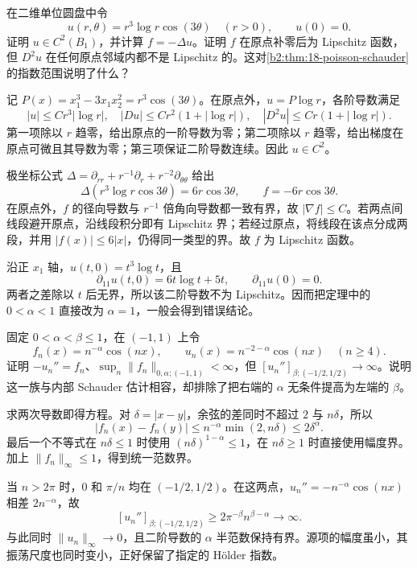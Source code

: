 \begin{optionalexercise}[Lipschitz 端点]
\label{b2:ex:18-schauder-lipschitz-endpoint}
在二维单位圆盘中令
\[
 u(r,\theta)=r^3\log r\cos(3\theta)\quad(r>0),\qquad u(0)=0.
\]
证明 \(u\in C^2(B_1)\)，并计算 \(f=-\Delta u\)。证明 \(f\) 在原点补零后为 Lipschitz 函数，但 \(D^2u\) 在任何原点邻域内都不是 Lipschitz 的。这对\cref{b2:thm:18-poisson-schauder}的指数范围说明了什么？
\end{optionalexercise}
\begin{solution}
记 \(P(x)=x_1^3-3x_1x_2^2=r^3\cos(3\theta)\)。在原点外，\(u=P\log r\)，各阶导数满足
\[
 |u|\le Cr^3|\log r|,\quad |Du|\le Cr^2(1+|\log r|),\quad
 |D^2u|\le Cr(1+|\log r|).
\]
第一项除以 \(r\) 趋零，给出原点的一阶导数为零；第二项除以 \(r\) 趋零，给出梯度在原点可微且其导数为零；第三项保证二阶导数连续。因此 \(u\in C^2\)。

极坐标公式 \(\Delta=\partial_{rr}+r^{-1}\partial_r+r^{-2}\partial_{\theta\theta}\) 给出
\[
 \Delta(r^3\log r\cos3\theta)=6r\cos3\theta,
 \qquad f=-6r\cos3\theta.
\]
在原点外，\(f\) 的径向导数与 \(r^{-1}\) 倍角向导数都一致有界，故 \(|\nabla f|\le C\)。若两点间线段避开原点，沿线段积分即有 Lipschitz 界；若经过原点，将线段在该点分成两段，并用 \(|f(x)|\le6|x|\)，仍得同一类型的界。故 \(f\) 为 Lipschitz 函数。

沿正 \(x_1\) 轴，\(u(t,0)=t^3\log t\)，且
\[
 \partial_{11}u(t,0)=6t\log t+5t,\qquad\partial_{11}u(0)=0.
\]
两者之差除以 \(t\) 后无界，所以该二阶导数不为 Lipschitz。因而把定理中的 \(0<\alpha<1\) 直接改为 \(\alpha=1\)，一般会得到错误结论。
\end{solution}

\begin{optionalexercise}[振荡源与指数的最优性]
\label{b2:ex:18-schauder-frequency}
固定 \(0<\alpha<\beta\le1\)，在 \((-1,1)\) 上令
\[
 f_n(x)=n^{-\alpha}\cos(nx),\qquad
 u_n(x)=n^{-2-\alpha}\cos(nx)\quad(n\ge4).
\]
证明 \(-u_n''=f_n\)、\(\sup_n\|f_n\|_{0,\alpha;(-1,1)}<\infty\)，但
\([u_n'']_{\beta;(-1/2,1/2)}\to\infty\)。说明这一族与内部 Schauder 估计相容，却排除了把右端的 \(\alpha\) 无条件提高为左端的 \(\beta\)。
\end{optionalexercise}
\begin{solution}
求两次导数即得方程。对 \(\delta=|x-y|\)，余弦的差同时不超过 \(2\) 与 \(n\delta\)，所以
\[
 |f_n(x)-f_n(y)|\le n^{-\alpha}\min(2,n\delta)
 \le2\delta^\alpha.
\]
最后一个不等式在 \(n\delta\le1\) 时使用 \((n\delta)^{1-\alpha}\le1\)，在 \(n\delta\ge1\) 时直接使用幅度界。加上 \(\|f_n\|_\infty\le1\)，得到统一范数界。

当 \(n>2\pi\) 时，\(0\) 和 \(\pi/n\) 均在 \((-1/2,1/2)\)。在这两点，\(u_n''=-n^{-\alpha}\cos(nx)\) 相差 \(2n^{-\alpha}\)，故
\[
 [u_n'']_{\beta;(-1/2,1/2)}
 \ge2\pi^{-\beta}n^{\beta-\alpha}\longrightarrow\infty.
\]
与此同时 \(\|u_n\|_\infty\to0\)，且二阶导数的 \(\alpha\) 半范数保持有界。源项的幅度虽小，其振荡尺度也同时变小，正好保留了指定的 Hölder 指数。
\end{solution}
